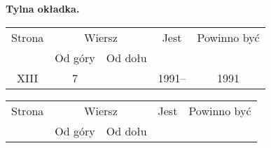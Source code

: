 \documentclass[a4paper,11pt]{article}
\begin{document}
\start \textbf{Tylna okładka.}

\vspace{\spaceFour}







\begin{center}

  \begin{tabular}{|c|c|c|c|c|}
    \hline
    Strona & \multicolumn{2}{c|}{Wiersz} & Jest
                              & Powinno być \\ \cline{2-3}
    & Od góry & Od dołu & & \\
    \hline
    XIII &  7 & & 1991-- & 1991 \\
    \hline
  \end{tabular}





  \begin{tabular}{|c|c|c|c|c|}
    \hline
    Strona & \multicolumn{2}{c|}{Wiersz} & Jest
                              & Powinno być \\ \cline{2-3}
    & Od góry & Od dołu & & \\
    \hline
    \hline
  \end{tabular}

\end{center}

\vspace{\spaceTwo}


\end{document}
